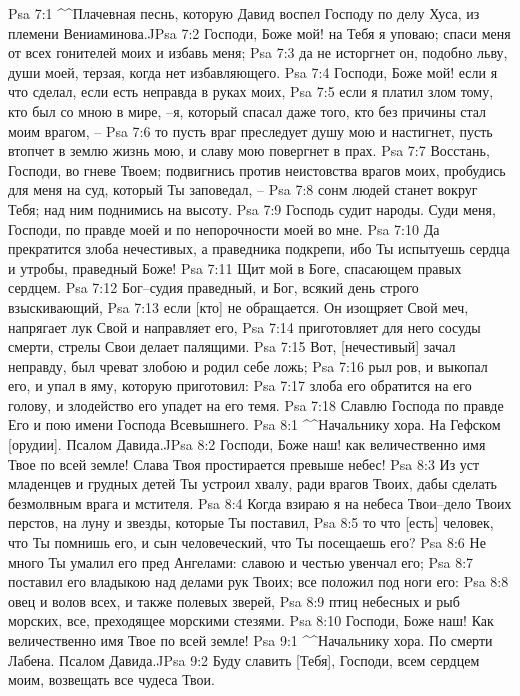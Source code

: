 Psa 7:1  ^^Плачевная песнь, которую Давид воспел Господу по делу Хуса, из племени Вениаминова.^^
Psa 7:2  Господи, Боже мой! на Тебя я уповаю; спаси меня от всех гонителей моих и избавь меня;
Psa 7:3  да не исторгнет он, подобно льву, души моей, терзая, когда нет избавляющего.
Psa 7:4  Господи, Боже мой! если я что сделал, если есть неправда в руках моих,
Psa 7:5  если я платил злом тому, кто был со мною в мире, --я, который спасал даже того, кто без причины стал моим врагом, --
Psa 7:6  то пусть враг преследует душу мою и настигнет, пусть втопчет в землю жизнь мою, и славу мою повергнет в прах.
Psa 7:7  Восстань, Господи, во гневе Твоем; подвигнись против неистовства врагов моих, пробудись для меня на суд, который Ты заповедал, --
Psa 7:8  сонм людей станет вокруг Тебя; над ним поднимись на высоту.
Psa 7:9  Господь судит народы. Суди меня, Господи, по правде моей и по непорочности моей во мне.
Psa 7:10  Да прекратится злоба нечестивых, а праведника подкрепи, ибо Ты испытуешь сердца и утробы, праведный Боже!
Psa 7:11  Щит мой в Боге, спасающем правых сердцем.
Psa 7:12  Бог--судия праведный, и Бог, всякий день строго взыскивающий,
Psa 7:13  если [кто] не обращается. Он изощряет Свой меч, напрягает лук Свой и направляет его,
Psa 7:14  приготовляет для него сосуды смерти, стрелы Свои делает палящими.
Psa 7:15  Вот, [нечестивый] зачал неправду, был чреват злобою и родил себе ложь;
Psa 7:16  рыл ров, и выкопал его, и упал в яму, которую приготовил:
Psa 7:17  злоба его обратится на его голову, и злодейство его упадет на его темя.
Psa 7:18  Славлю Господа по правде Его и пою имени Господа Всевышнего.
Psa 8:1  ^^Начальнику хора. На Гефском [орудии]. Псалом Давида.^^
Psa 8:2  Господи, Боже наш! как величественно имя Твое по всей земле! Слава Твоя простирается превыше небес!
Psa 8:3  Из уст младенцев и грудных детей Ты устроил хвалу, ради врагов Твоих, дабы сделать безмолвным врага и мстителя.
Psa 8:4  Когда взираю я на небеса Твои--дело Твоих перстов, на луну и звезды, которые Ты поставил,
Psa 8:5  то что [есть] человек, что Ты помнишь его, и сын человеческий, что Ты посещаешь его?
Psa 8:6  Не много Ты умалил его пред Ангелами: славою и честью увенчал его;
Psa 8:7  поставил его владыкою над делами рук Твоих; все положил под ноги его:
Psa 8:8  овец и волов всех, и также полевых зверей,
Psa 8:9  птиц небесных и рыб морских, все, преходящее морскими стезями.
Psa 8:10  Господи, Боже наш! Как величественно имя Твое по всей земле!
Psa 9:1  ^^Начальнику хора. По смерти Лабена. Псалом Давида.^^
Psa 9:2  Буду славить [Тебя], Господи, всем сердцем моим, возвещать все чудеса Твои.
